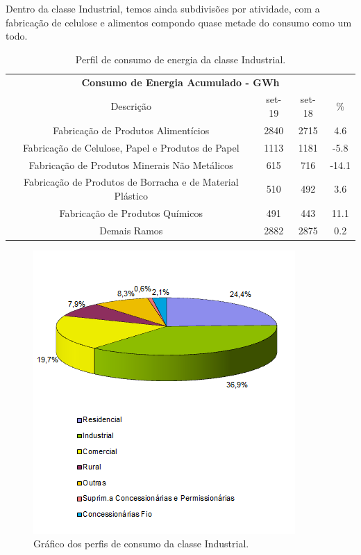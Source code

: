 \documentclass[grad,numbers]{coppe}
\begin{document}
  Dentro da classe Industrial, temos ainda subdivisões por atividade, com a fabricação de celulose e alimentos compondo quase metade do consumo como um todo.
  \begin{table}[H]

  \caption{\label{tab:unnamed-chunk-13}Perfil de consumo de energia da classe Industrial.}
  \centering
  \begin{tabular}[t]{cccc}
  \toprule
  \multicolumn{4}{c}{\textbf{Consumo de Energia Acumulado - GWh}} \\
  \cmidrule(l{3pt}r{3pt}){1-4}
  Descrição & set-19 & set-18 & \%\\
  \midrule
  Fabricação de Produtos Alimentícios & 2840 & 2715 & 4.6\\
  Fabricação de Celulose, Papel e Produtos de Papel & 1113 & 1181 & -5.8\\
  Fabricação de Produtos Minerais Não Metálicos & 615 & 716 & -14.1\\
  Fabricação de Produtos de Borracha e de Material Plástico & 510 & 492 & 3.6\\
  Fabricação de Produtos Químicos & 491 & 443 & 11.1\\
  \addlinespace
  Demais Ramos & 2882 & 2875 & 0.2\\
  \bottomrule
  \end{tabular}
  \end{table}
  \begin{figure}[H]
  \includegraphics[width=1\linewidth]{img/industrial_dist} \caption{Gráfico dos perfis de consumo da classe Industrial.}\label{fig:unnamed-chunk-14}
  \end{figure}
\end{document}
